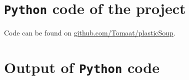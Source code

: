 \vfill



\clearpage

\begin{appendix}{\small
\renewcommand{\thesubsection}{\thesection.\roman{subsection}}
\renewcommand{\thesubsubsection}{\thesubsection--\arabic{subsubsection}}

\section{\texttt{Python} code of the project}
\label{sec:ap-code}
Code can be found on \url{github.com/Tomaat/plasticSoup}.

%
%


\section{Output of \texttt{Python} code}
\label{sec:ap-out}
}
\end{appendix}
